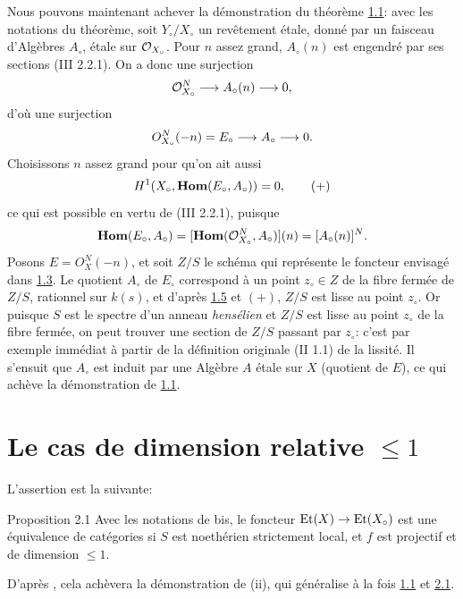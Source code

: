 \documentclass[10pt]{../fichiers-configuration-latex/smfart}
\begin{document}
Nous pouvons maintenant achever la démonstration du théorème \hyperref[XIII.prop1.1]{1.1}: avec
les notations du théorème, soit $Y_{\circ}/X_{\circ}$ un revêtement
étale, donné par un faisceau d'Algèbres $A_{\circ}$, étale sur
${\mathcal O}_{X_{\circ}}$. Pour $n$ assez grand, $A_{\circ}(n)$ est engendré
par ses sections (\EGA III 2.2.1). On a donc une surjection
$$
{\mathcal O}^N_{X_{\circ}}\longrightarrow A_{\circ}(n)\longrightarrow
0{},
$$
d'où une surjection
$$
O^N_{X_{\circ}}(-n)=E_{\circ}\longrightarrow A_{\circ}\longrightarrow
0{}.
$$
Choisissons $n$ assez grand pour qu'on ait aussi
\begin{equation*}
H^1(X_{\circ},\operatorname{\mathbf{Hom}}(E_{\circ}, A_{\circ}))=0{},\tag{$+$}
\end{equation*}
ce qui est possible en vertu de (\EGA III 2.2.1), puisque
$$
\operatorname{\mathbf{Hom}}(E_{\circ},A_{\circ})=[\operatorname{\mathbf{Hom}}({\mathcal O}^N_{X_{\circ}},A_{\circ})](n)=
[A_{\circ}(n)]^N{}.
$$
Posons $E=O^N_X(-n)$, et soit $Z/S$ le schéma qui représente le
foncteur envisagé dans \hyperref[XIII.lem1.3]{1.3}. Le quotient $A_{\circ}$ de $E_{\circ}$
correspond à un point $z_{\circ}\in Z$ de la fibre fermée de $Z/S$,
rationnel sur $k(s)$, et d'après \hyperref[XIII.subsec1.5]{1.5} et $(+)$, $Z/S$ est lisse au
point $z_{\circ}$. Or puisque $S$ est le spectre d'un anneau
\emph{hensélien} et $Z/S$ est lisse au point
$z_{\circ}$ de la fibre fermée, on peut trouver une section de $Z/S$ passant par $z_{\circ}$: c'est par exemple
immédiat à partir de la définition originale (\SGA II 1.1) de la
lissité. Il s'ensuit que $A_{\circ}$ est induit par une Algèbre $A$
étale sur $X$ (quotient de $E$), ce qui achève la démonstration de
\hyperref[XIII.prop1.1]{1.1}.

\section{Le cas de dimension relative $≤ 1$}\pageoriginale 

L'assertion est la suivante:

\begin{enonce*}{Proposition 2.1}
Avec les notations de \rm{} bis, le foncteur
$\operatorname{Et}(X)\rightarrow \operatorname{Et}(X_{\circ})$ est une équivalence de catégories
si $S$ est noethérien strictement local, et $f$ est projectif et de
dimension $\leq 1$.

D'après {\rm {}}, cela achèvera la démonstration de {\rm
(ii)}, qui généralise à la fois \hyperref[XIII.prop1.1]{1.1} et \hyperref[XIII.prop2.1]{2.1}.
\end{enonce*}
\end{document}
